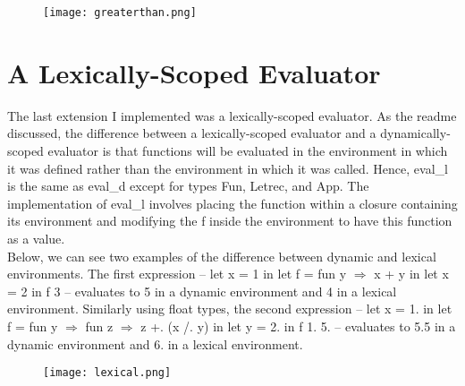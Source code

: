 \documentclass[12pt]{article}
\begin{document}
\begin{figure}[hbt]
    \centering
    \texttt{[image: greaterthan.png]}
\end{figure}

\section{A Lexically-Scoped Evaluator}

The last extension I implemented was a lexically-scoped evaluator. As the readme discussed, the difference between a lexically-scoped evaluator and a dynamically-scoped evaluator is that functions will be evaluated in the environment in which it was defined rather than the environment in which it was called. Hence, eval\_l is the same as eval\_d except for types Fun, Letrec, and App. The implementation of eval\_l involves placing the function within a closure containing its environment and modifying the f inside the environment to have this function as a value. 
\\

Below, we can see two examples of the difference between dynamic and lexical environments. The first expression -- let x = 1 in let f = fun y $\Rightarrow$ x + y in let x = 2 in f 3 -- evaluates to 5 in a dynamic environment and 4 in a lexical environment. Similarly using float types, the second expression -- let x = 1. in let f = fun y $\Rightarrow$ fun z $\Rightarrow$ z +. (x /. y) in let y = 2. in f 1. 5. -- evaluates to 5.5 in a dynamic environment and 6. in a lexical environment.

    \begin{figure}[hbt]
        \centering
        \texttt{[image: lexical.png]}
    \end{figure}
\end{document}
